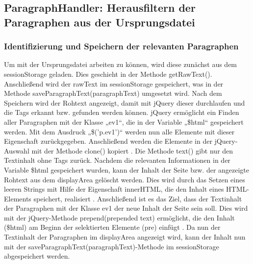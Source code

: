 \subsection{ParagraphHandler: Herausfiltern der Paragraphen aus der Ursprungsdatei}

\subsubsection{Identifizierung und Speichern der relevanten Paragraphen}
Um mit der Ursprungsdatei arbeiten zu können, wird diese zunächst aus dem sessionStorage geladen. Dies geschieht in der Methode getRawText(). Anschließend wird der rawText im sessionStorage gespeichert, was in der Methode saveParagraphText(paragraphText) umgesetzt wird. Nach dem Speichern wird der Rohtext angezeigt, damit mit jQuery dieser durchlaufen und die Tags erkannt bzw. gefunden werden können. jQuery ermöglicht ein Finden aller Paragraphen mit der Klasse „ev1“, die in der Variable „\$html“ gespeichert werden. Mit dem Ausdruck „\$('p.ev1')“ werden nun alle Elemente mit dieser Eigenschaft zurückgegeben. Anschließend werden die Elemente in der jQuery-Auswahl mit der Methode clone() kopiert \cite{clone}. Die Methode text() gibt nur den Textinhalt ohne Tags zurück. Nachdem die relevanten Informationen in der Variable \$html gespeichert wurden, kann der Inhalt der Seite bzw. der angezeigte Rohtext aus dem displayArea gelöscht werden. Dies wird durch das Setzen eines leeren Strings mit Hilfe der Eigenschaft innerHTML, die den Inhalt eines HTML-Elements speichert, realisiert \cite{innerhtml}. Anschließend ist es das Ziel, dass der Textinhalt der Paragraphen mit der Klasse ev1 der neue Inhalt der Seite sein soll. Dies wird mit der jQuery-Methode prepend(prepended text) ermöglicht, die den Inhalt (\$html) am Beginn der selektierten Elemente (pre) einfügt \cite{prepend}. Da nun der Textinhalt der Paragraphen im displayArea angezeigt wird, kann der Inhalt nun mit der saveParagraphText(paragraphText)-Methode im sessionStorage abgespeichert werden.

